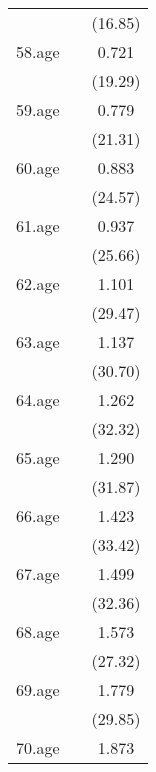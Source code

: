 {\begin{tabular}{l*{2}{c}}
            &                     &     (16.85)         \\
[1em]
58.age      &                     &       0.721\sym{***}\\
            &                     &     (19.29)         \\
[1em]
59.age      &                     &       0.779\sym{***}\\
            &                     &     (21.31)         \\
[1em]
60.age      &                     &       0.883\sym{***}\\
            &                     &     (24.57)         \\
[1em]
61.age      &                     &       0.937\sym{***}\\
            &                     &     (25.66)         \\
[1em]
62.age      &                     &       1.101\sym{***}\\
            &                     &     (29.47)         \\
[1em]
63.age      &                     &       1.137\sym{***}\\
            &                     &     (30.70)         \\
[1em]
64.age      &                     &       1.262\sym{***}\\
            &                     &     (32.32)         \\
[1em]
65.age      &                     &       1.290\sym{***}\\
            &                     &     (31.87)         \\
[1em]
66.age      &                     &       1.423\sym{***}\\
            &                     &     (33.42)         \\
[1em]
67.age      &                     &       1.499\sym{***}\\
            &                     &     (32.36)         \\
[1em]
68.age      &                     &       1.573\sym{***}\\
            &                     &     (27.32)         \\
[1em]
69.age      &                     &       1.779\sym{***}\\
            &                     &     (29.85)         \\
[1em]
70.age      &                     &       1.873\sym{***}\\

\end{tabular}}
